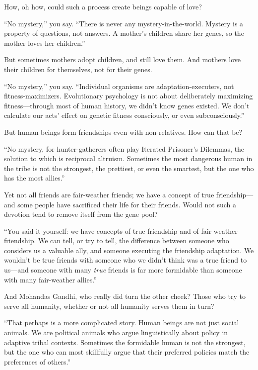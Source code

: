  How, oh how, could such a process create beings capable of love?


 ``No mystery,'' you say.
``There is never any mystery-in-the-world. Mystery is
a property of questions, not answers. A mother's
children share her genes, so the mother loves her
children.''


 But sometimes mothers adopt children, and still love them. And
mothers love their children for themselves, not for their genes.


 ``No mystery,'' you say.
``Individual organisms are adaptation-executers, not
fitness-maximizers. Evolutionary psychology is not about deliberately
maximizing fitness---through most of human history, we
didn't know genes existed. We don't
calculate our acts' effect on genetic fitness
consciously, or even subconsciously.''


 But human beings form friendships even with non-relatives. How can
that be?


 ``No mystery, for hunter-gatherers often play
Iterated Prisoner's Dilemmas, the solution to which is
reciprocal altruism. Sometimes the most dangerous human in the tribe is
not the strongest, the prettiest, or even the smartest, but the one who
has the most allies.''


 Yet not all friends are fair-weather friends; we have a concept of
true friendship---and some people have sacrificed their life for their
friends. Would not such a devotion tend to remove itself from the gene
pool?


 ``You said it yourself: we have concepts of true
friendship and of fair-weather friendship. We can tell, or try to tell,
the difference between someone who considers us a valuable ally, and
someone executing the friendship adaptation. We
wouldn't be true friends with someone who we
didn't think was a true friend to us---and someone with
many \textit{true} friends is far more formidable than someone with
many fair-weather allies.''


 And Mohandas Gandhi, who really did turn the other cheek? Those
who try to serve all humanity, whether or not all humanity serves them
in turn?


 ``That perhaps is a more complicated story. Human
beings are not just social animals. We are political animals who argue
linguistically about policy in adaptive tribal contexts. Sometimes the
formidable human is not the strongest, but the one who can most
skillfully argue that their preferred policies match the preferences of
others.''


